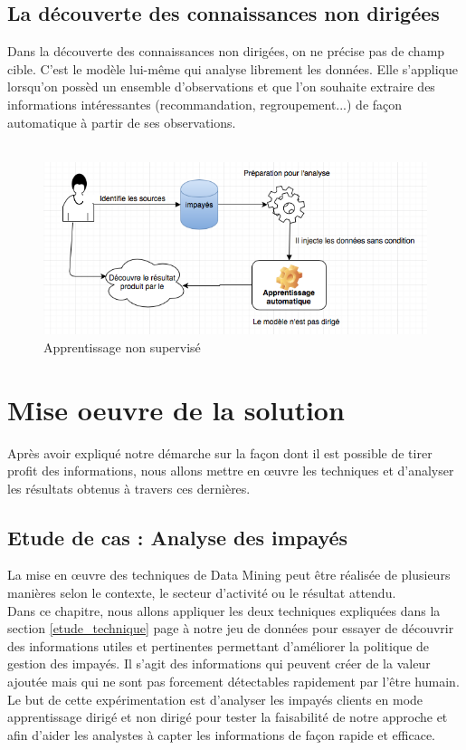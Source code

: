 \documentclass[11pt,a4paper]{report}
\begin{document}
\subsection{La découverte des connaissances non dirigées}
Dans la découverte des connaissances non dirigées, on ne précise pas de champ cible. C'est le modèle lui-même qui analyse librement les données. Elle s'applique lorsqu'on possèd un ensemble d'observations et que l'on souhaite extraire des informations intéressantes (recommandation, regroupement...) de façon automatique à partir de ses observations.\\\\
\begin{figure}[h]
\centering
\includegraphics[scale=0.70]{nondirigees.png}
\caption{Apprentissage non supervisé}
\label{nondirigee}
\end{figure}
\newpage 

\section{Mise oeuvre de la solution \label{mise_en_oeuvre}}
Après avoir expliqué notre démarche sur la façon dont il est possible de tirer profit des informations, nous allons mettre en œuvre les techniques et d'analyser les résultats obtenus à travers ces dernières. 
  \subsection{Etude de cas : Analyse des impayés}
  
La mise en œuvre des techniques de Data Mining peut être réalisée de plusieurs manières selon le contexte, le secteur d'activité ou le résultat attendu. \\
Dans ce chapitre, nous allons appliquer les deux techniques expliquées dans la section \ref{etude_technique} page \pageref{etude_technique} à notre  jeu de données pour essayer de découvrir des informations utiles et pertinentes permettant d'améliorer la politique de gestion des impayés. Il s'agit des informations qui peuvent créer de la valeur ajoutée mais qui ne sont pas forcement détectables rapidement par l'être humain.
\\
Le but de cette expérimentation est d'analyser les impayés clients  en mode apprentissage dirigé et non dirigé  pour tester la faisabilité de notre approche et afin d'aider les analystes à capter les informations de façon rapide et efficace.
\end{document}
